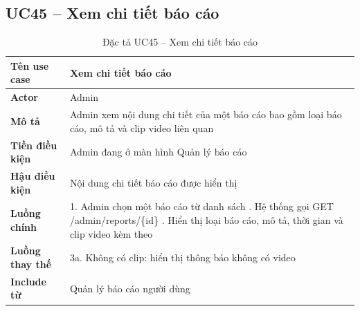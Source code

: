 \subsection*{UC45 -- Xem chi tiết báo cáo}
\begin{table}[H]
    \captionsetup{justification=raggedright, singlelinecheck=false}
    \caption{Đặc tả UC45 -- Xem chi tiết báo cáo}
\centering
\begin{tabular}{|p{3.5cm}|p{10cm}|}
\hline
\textbf{Tên use case} & Xem chi tiết báo cáo \\
\hline
\textbf{Actor} & Admin \\
\hline
\textbf{Mô tả} & Admin xem nội dung chi tiết của một báo
  cáo bao gồm loại báo cáo, mô tả và clip video liên quan \\
\hline
\textbf{Tiền điều kiện} & Admin đang ở màn hình Quản lý
  báo cáo \\
\hline
\textbf{Hậu điều kiện} & Nội dung chi tiết báo cáo được
  hiển thị \\
\hline
\textbf{Luồng chính} &
  1. Admin chọn một báo cáo từ danh sách \newline
  2. Hệ thống gọi GET /admin/reports/\{id\} \newline
  3. Hiển thị loại báo cáo, mô tả, thời gian
     và clip video kèm theo \\
\hline
\textbf{Luồng thay thế} &
  3a. Không có clip: hiển thị thông báo không có video \\
\hline
\textbf{Include từ} & Quản lý báo cáo người dùng \\
\hline
\end{tabular}

\end{table}

